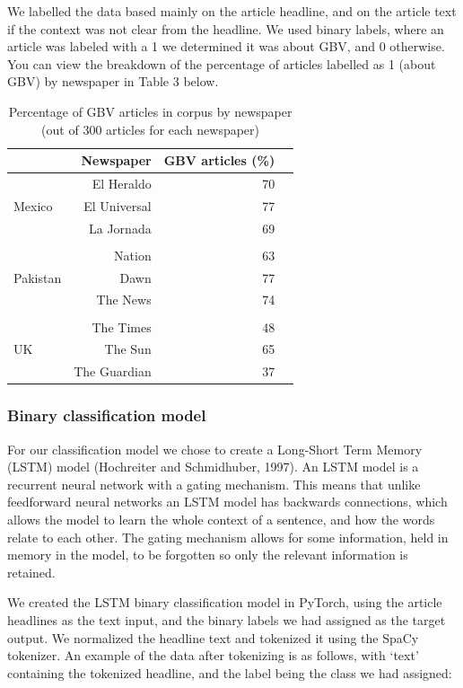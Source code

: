 \documentclass{article}
\begin{document}
{{{We labelled the data based mainly on the article headline, and on the article text if the context was not clear from the headline. We used binary labels, where an article was labeled with a 1 we determined it was about GBV, and 0 otherwise. You can view the breakdown of the percentage of articles labelled as 1 (about GBV) by newspaper in Table 3 below.

\begin{table}[!htp]\centering
	\caption{Percentage of GBV articles in corpus by newspaper (out of 300 articles for each newspaper)}\label{tab: }
	\scriptsize
	\begin{tabular}{lrrr}\toprule
		&\textbf{Newspaper} &\textbf{GBV articles (\%)} \\\midrule
		\multirow{3}{*}{Mexico} &El Heraldo &70 \\
		&El Universal &77 \\
		&La Jornada &69 \\
		& & & \\
		\multirow{3}{*}{Pakistan} &Nation &63 \\
		&Dawn &77 \\
		&The News &74 \\
		& & & \\
		\multirow{3}{*}{UK} &The Times &48 \\
		&The Sun &65 \\
		&The Guardian &37 \\
		\bottomrule
	\end{tabular}
\end{table}

}

\subsubsection{Binary classification model}{

For our classification model we chose to create a Long-Short Term Memory (LSTM) model (Hochreiter and Schmidhuber, 1997). An LSTM model is a recurrent neural network with a gating mechanism. This means that unlike feedforward neural networks an LSTM model has backwards connections, which allows the model to learn the whole context of a sentence, and how the words relate to each other. The gating mechanism allows for some information, held in memory in the model, to be forgotten so only the relevant information is retained. 

We created the LSTM binary classification model in PyTorch, using the article headlines as the text input, and the binary labels we had assigned as the target output. We normalized the headline text and tokenized it using the SpaCy tokenizer. An example of the data after tokenizing is as follows, with ‘text’ containing the tokenized headline, and the label being the class we had assigned:

}}}
\end{document}
